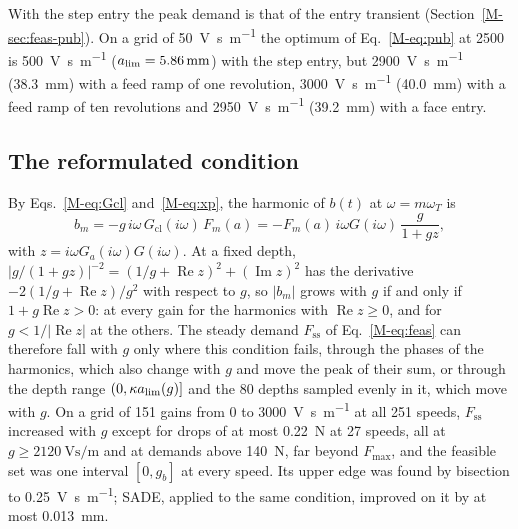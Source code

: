 With the step entry the peak demand is that of the entry transient (Section~\ref{M-sec:feas-pub}). On a grid of \SI{50}{\volt\second\per\metre} the optimum of Eq.~\eqref{M-eq:pub} at \SI{2500}{\rpm} is \SI{500}{\volt\second\per\metre} ($a_{\lim}=\SI{5.86}{\milli\metre}$) with the step entry, but \SI{2900}{\volt\second\per\metre} (\SI{38.3}{\milli\metre}) with a feed ramp of one revolution, \SI{3000}{\volt\second\per\metre} (\SI{40.0}{\milli\metre}) with a feed ramp of ten revolutions and \SI{2950}{\volt\second\per\metre} (\SI{39.2}{\milli\metre}) with a face entry.

\subsection{The reformulated condition}\label{supp:feas-new}

By Eqs.~\eqref{M-eq:Gcl} and~\eqref{M-eq:xp}, the harmonic of $b(t)$ at $\omega=m\omega_T$ is
\begin{equation}\label{eq:supp-feas-bm}
  b_m=-g\,i\omega\,G_{\mathrm{cl}}(i\omega)\,F_m(a)=-F_m(a)\,i\omega G(i\omega)\,\frac{g}{1+gz},
\end{equation}
with $z=i\omega G_a(i\omega)G(i\omega)$. At a fixed depth, $\lvert g/(1+gz)\rvert^{-2}=(1/g+\operatorname{Re}z)^2+(\operatorname{Im}z)^2$ has the derivative $-2(1/g+\operatorname{Re}z)/g^2$ with respect to $g$, so $\lvert b_m\rvert$ grows with $g$ if and only if $1+g\operatorname{Re}z>0$: at every gain for the harmonics with $\operatorname{Re}z\ge0$, and for $g<1/\lvert\operatorname{Re}z\rvert$ at the others. The steady demand $F_{\mathrm{ss}}$ of Eq.~\eqref{M-eq:feas} can therefore fall with $g$ only where this condition fails, through the phases of the harmonics, which also change with $g$ and move the peak of their sum, or through the depth range $(0,\kappa a_{\lim}(g)]$ and the 80 depths sampled evenly in it, which move with $g$. On a grid of 151 gains from 0 to \SI{3000}{\volt\second\per\metre} at all 251 speeds, $F_{\mathrm{ss}}$ increased with $g$ except for drops of at most \SI{0.22}{\newton} at 27 speeds, all at $g\ge\SI{2120}{\volt\second\per\metre}$ and at demands above \SI{140}{\newton}, far beyond $F_{\max}$, and the feasible set was one interval $[0,g_b]$ at every speed. Its upper edge was found by bisection to \SI{0.25}{\volt\second\per\metre}; SADE, applied to the same condition, improved on it by at most \SI{0.013}{\milli\metre}.

